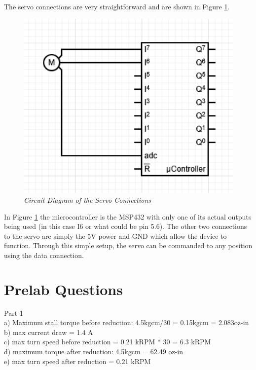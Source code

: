 \documentclass[CMPE]{KGCOEReport}
\begin{document}
The servo connections are very straightforward and are shown in Figure 
\ref{fig:servo}.
\begin{figure}[H]
    \centering
    \includegraphics[width=1\textwidth]{Images/servo_diagram.png} %
    \caption{\textit{Circuit Diagram of the Servo Connections}}
    \label{fig:servo}
\end{figure}
In Figure \ref{fig:servo} the microcontroller is the MSP432 with only one of 
its actual outputs being used (in this case I6 or what could be pin 5.6). The 
other two connections to the servo are simply the 5V power and GND which allow
 the device to function. Through this simple setup, the servo can be commanded
  to any position using the data connection.

\section*{Prelab Questions}
Part 1 \\
a) Maximum stall torque before reduction: 4.5kgcm/30 = 0.15kgcm = 2.083oz-in \\
b) max current draw = 1.4 A \\
c) max turn speed before reduction = 0.21 kRPM * 30 = 6.3 kRPM \\
d) maximum torque after reduction: 4.5kgcm = 62.49 oz-in \\
e) max turn speed after reduction = 0.21 kRPM \\
\end{document}
